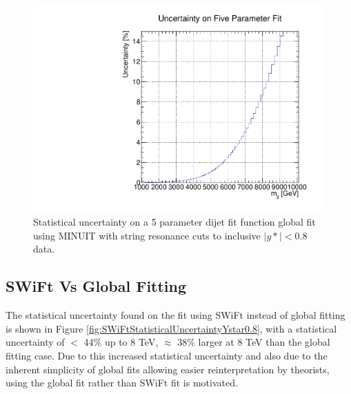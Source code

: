 \begin{figure}
    \centering
    \includegraphics[width=1\linewidth]{figures/app-GlobalFitStudies/5ParamGlobalFit_ystar0p8_Uncertainty_MINUIT.pdf}
    \caption{Statistical uncertainty on a 5 parameter dijet fit function global fit using MINUIT with string resonance cuts to inclusive $|y*|<0.8$ data.}
    \label{fig:5ParamMINUITComparison}
\end{figure}


\subsection{SWiFt Vs Global Fitting}

The statistical uncertainty found on the fit using SWiFt instead of global fitting is shown in Figure \ref{fig:SWiFtStatisticalUncertaintyYstar0.8}, with a statistical uncertainty of $ < $ 44\% up to 8 TeV, $\approx$ 38\% larger at 8 TeV than the global fitting case. Due to this increased statistical uncertainty and also due to the inherent simplicity of global fits allowing easier reinterpretation by theorists, using the global fit rather than SWiFt fit is motivated.

